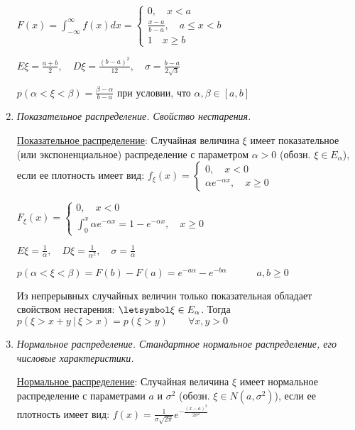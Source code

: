 \begin{enumerate}
    $F(x) = \int_{-\infty}^\infty f(x)dx = \begin{cases}0, \quad x < a \\ \frac{x - a}{b - a}, \quad a \leq x < b \\ 1 \quad x \geq b\end{cases}$

    $E\xi = \frac{a + b}{2}, \quad D\xi = \frac{(b - a)^2}{12}, \quad \sigma = \frac{b - a}{2\sqrt{3}}$

    $p(\alpha < \xi < \beta) = \frac{\beta - \alpha}{b - a}$ при условии, что $\alpha, \beta \in [a, b]$

    \item \textit{Показательное распределение. Свойство нестарения.}

    \hyperlink{exponentialdistribution}{Показательное распределение}: Случайная величина $\xi$ имеет показательное (или экспоненциальное) распределение с параметром $\alpha > 0$ (обозн. $\xi \in E_\alpha$),
    если ее плотность имеет вид: $f_\xi(x) = \begin{cases}0, \quad x < 0 \\ \alpha e^{-\alpha x}, \quad x \geq 0\end{cases}$

    $F_\xi(x) = \begin{cases}0, \quad x < 0 \\ \int_0^x \alpha e^{-\alpha x} = 1 - e^{-\alpha x}, \quad x \geq 0\end{cases}$

    $E\xi = \frac{1}{\alpha}, \quad D\xi = \frac{1}{\alpha^2}, \quad \sigma = \frac{1}{\alpha}$

    $p(\alpha < \xi < \beta) = F(b) - F(a) = e^{-a\alpha} - e^{-b\alpha} \quad\quad\quad a, b \geq 0$

    Из непрерывных случайных величин только показательная обладает свойством нестарения:
    \Ths $\letsymbol \xi \in E_\alpha$. Тогда $p(\xi > x + y \ | \ \xi > x) = p(\xi > y) \quad\quad \forall x, y > 0$

    \item \textit{Нормальное распределение. Стандартное нормальное распределение, его числовые характеристики.}

    \hyperlink{normaldistribution}{Нормальное распределение}: Случайная величина $\xi$ имеет нормальное распределение с параметрами $a$ и $\sigma^2$ (обозн. $\xi \in N(a, \sigma^2)$), если
    ее плотность имеет вид: $f(x) = \frac{1}{\sigma \sqrt{2\pi}} e^{-\frac{(x - a)^2}{2\sigma^2}}$


\end{enumerate}

